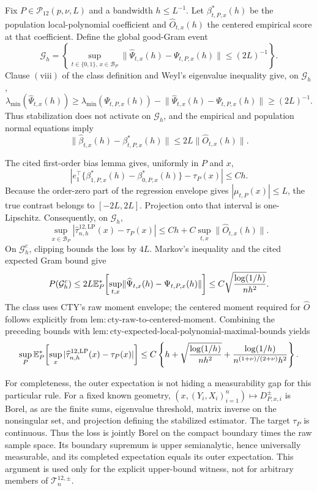Fix \(P\in\mathcal P_{12}(p,\nu,L)\) and a bandwidth \(h\leq L^{-1}\).  Let \(\beta^*_{t,P,x}(h)\) be the population local-polynomial coefficient and \(\widehat O_{t,x}(h)\) the centered empirical score at that coefficient.  Define the global good-Gram event
\[
 \mathcal G_h=\left\{
 \sup_{t\in\{0,1\},\,x\in\mathcal B_P}
 \lVert\widehat\Psi_{t,x}(h)-\Psi_{t,P,x}(h)\rVert
 \leq(2L)^{-1}
 \right\}.
\]
Clause \(\mathrm{(viii)}\) of the class definition and Weyl's eigenvalue inequality give, on \(\mathcal G_h\),
\[
 \lambda_{\min}(\widehat\Psi_{t,x}(h))
 \geq\lambda_{\min}(\Psi_{t,P,x}(h))
 -\lVert\widehat\Psi_{t,x}(h)-\Psi_{t,P,x}(h)\rVert
 \geq(2L)^{-1}.
\]
Thus stabilization does not activate on \(\mathcal G_h\), and the empirical and population normal equations imply
\[
 \lVert\widehat\beta_{t,x}(h)-\beta^*_{t,P,x}(h)\rVert
 \leq2L\lVert\widehat O_{t,x}(h)\rVert.
\]

The cited first-order bias lemma gives, uniformly in \(P\) and \(x\),
\[
 \left|e_1^\top\{\beta^*_{1,P,x}(h)-\beta^*_{0,P,x}(h)\}-\tau_P(x)\right|\leq Ch.
\]
Because the order-zero part of the regression envelope gives \(|\mu_{t,P}(x)|\leq L\), the true contrast belongs to \([-2L,2L]\).  Projection onto that interval is one-Lipschitz.  Consequently, on \(\mathcal G_h\),
\[
 \sup_{x\in\mathcal B_P}
 |\widehat\tau^{12,\mathrm{LP}}_{n,h}(x)-\tau_P(x)|
 \leq Ch+C\sup_{t,x}\lVert\widehat O_{t,x}(h)\rVert.
\]
On \(\mathcal G_h^c\), clipping bounds the loss by \(4L\).  Markov's inequality and the cited expected Gram bound give
\[
 P(\mathcal G_h^c)
 \leq2L\mathbb E_P^*\!\left[
 \sup_{t,x}\lVert\widehat\Psi_{t,x}(h)-\Psi_{t,P,x}(h)\rVert
 \right]
 \leq C\sqrt{{\log(1/h)\over nh^2}}.
\]
The class uses CTY's raw moment envelope; the centered moment required for \(\widehat O\) follows explicitly from \(\mathrm{lem:cty\text{-}raw\text{-}to\text{-}centered\text{-}moment}\).  Combining the preceding bounds with \(\mathrm{lem:cty\text{-}expected\text{-}local\text{-}polynomial\text{-}maximal\text{-}bounds}\) yields
\[
 \sup_P\mathbb E_P^*\!\left[
 \sup_x|\widehat\tau^{12,\mathrm{LP}}_{n,h}(x)-\tau_P(x)|
 \right]
 \leq C\left\{
 h+\sqrt{{\log(1/h)\over nh^2}}
 +{\log(1/h)\over n^{(1+\nu)/(2+\nu)}h^2}
 \right\}.
\]

For completeness, the outer expectation is not hiding a measurability gap for this particular rule.  For a fixed known geometry, \((x,(Y_i,X_i)_{i=1}^n)\mapsto D^{\pm}_{P,x,i}\) is Borel, as are the finite sums, eigenvalue threshold, matrix inverse on the nonsingular set, and projection defining the stabilized estimator.  The target \(\tau_P\) is continuous.  Thus the loss is jointly Borel on the compact boundary times the raw sample space.  Its boundary supremum is upper semianalytic, hence universally measurable, and its completed expectation equals its outer expectation.  This argument is used only for the explicit upper-bound witness, not for arbitrary members of \(\mathcal T_n^{12,\pm}\).

